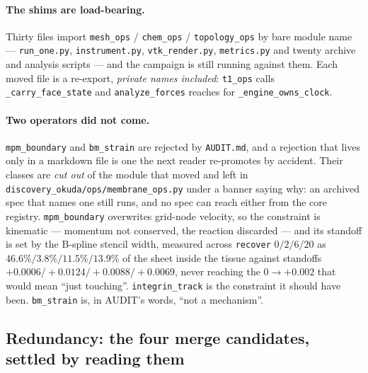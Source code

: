 \documentclass[11pt,a4paper]{article}
\newcommand{\code}[1]{\texttt{\small #1}}
\begin{document}
\paragraph{The shims are load-bearing.} Thirty files import \code{mesh\_ops} / \code{chem\_ops} /
\code{topology\_ops} by bare module name --- \code{run\_one.py}, \code{instrument.py},
\code{vtk\_render.py}, \code{metrics.py} and twenty archive and analysis scripts --- and the campaign
is still running against them. Each moved file is a re-export, \emph{private names included}:
\code{t1\_ops} calls \code{\_carry\_face\_state} and \code{analyze\_forces} reaches for
\code{\_engine\_owns\_clock}.

\paragraph{Two operators did not come.} \code{mpm\_boundary} and \code{bm\_strain} are rejected by
\code{AUDIT.md}, and a rejection that lives only in a markdown file is one the next reader
re-promotes by accident. Their classes are \emph{cut out} of the module that moved and left in
\code{discovery\_okuda/ops/membrane\_ops.py} under a banner saying why: an archived spec that names
one still runs, and no spec can reach either from the core registry. \code{mpm\_boundary} overwrites
grid-node velocity, so the constraint is kinematic --- momentum not conserved, the reaction
discarded --- and its standoff is set by the B-spline stencil width, measured across \code{recover}
$0/2/6/20$ as $46.6\%/3.8\%/11.5\%/13.9\%$ of the sheet inside the tissue against standoffs
$+0.0006/+0.0124/+0.0088/+0.0069$, never reaching the $0 \to +0.002$ that would mean ``just
touching''. \code{integrin\_track} is the constraint it should have been. \code{bm\_strain} is, in
AUDIT's words, ``not a mechanism''.

\subsection{Redundancy: the four merge candidates, settled by reading them}
\end{document}
